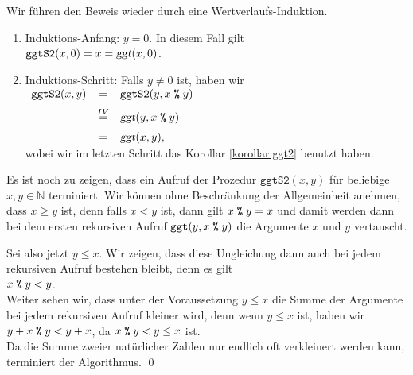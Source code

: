 \proof
Wir führen den Beweis wieder durch eine Wertverlaufs-Induktion.
\begin{enumerate}
\item Induktions-Anfang: $y = 0$.  In diesem Fall gilt
      \\[0.2cm]
      \hspace*{1.3cm}
      $\mathtt{ggtS2}(x, 0) = x = \textsl{ggt}(x, 0)$.
\item Induktions-Schritt: Falls $y \not= 0$ ist, haben wir
      \\[0.2cm]
      \hspace*{1.3cm}
      $
      \begin{array}[t]{lcl}
        \mathtt{ggtS2}(x, y) & = & \mathtt{ggtS2}(y, x \;\texttt{\%}\; y)              \\[0.2cm]
                             & \stackrel{IV}{=} & \textsl{ggt}(y, x \;\texttt{\%}\; y) \\[0.2cm]
                             & = & \textsl{ggt}(x, y),
      \end{array}
      $
      \\[0.2cm]
      wobei wir im letzten Schritt das Korollar \ref{korollar:ggt2} benutzt haben. 
\end{enumerate}
Es ist noch zu zeigen, dass ein Aufruf der Prozedur $\texttt{ggtS2}(x, y)$ für beliebige
$x,y \in \mathbb{N}$ terminiert.  Wir können ohne Beschränkung der Allgemeinheit anehmen,
dass $x \geq y$ ist, denn falls $x < y$ ist, dann gilt $x \;\texttt{\%}\; y = x$ und damit werden
dann bei dem ersten rekursiven Aufruf $\mathtt{ggt}(y, x \;\texttt{\%}\; y)$ die Argumente $x$ und
$y$ vertauscht.

Sei also jetzt $y \leq x$.  Wir zeigen, dass diese Ungleichung dann auch bei jedem
rekursiven Aufruf bestehen bleibt, denn es gilt
\\[0.2cm]
\hspace*{1.3cm}
$x \;\texttt{\%}\; y < y$.
\\[0.2cm]
Weiter sehen wir, dass unter der Voraussetzung $y \leq x$ die Summe der Argumente bei
jedem rekursiven Aufruf kleiner wird,
denn wenn $y \leq x$ ist, haben wir
\\[0.2cm]
\hspace*{1.3cm}
$y + x \;\texttt{\%}\; y < y + x$, \quad da $x \;\texttt{\%}\; y < y \leq x$ ist.
\\[0.2cm]
Da die Summe zweier natürlicher Zahlen nur endlich oft verkleinert werden kann, 
terminiert der Algorithmus.  
\qed


